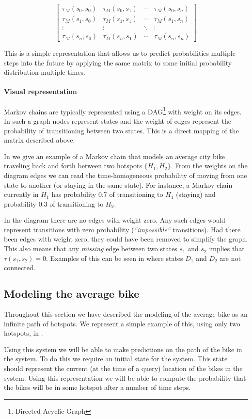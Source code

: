 \begin{equation}\label{markov:matrix}
\begin{bmatrix}
\tau_M(s_0, s_0) & \tau_M(s_0, s_1) & \cdots & \tau_M(s_0, s_n)\\
\tau_M(s_1, s_0) & \tau_M(s_1, s_1) & \cdots & \tau_M(s_1, s_n)\\
\vdots & \vdots & \ddots & \vdots\\
\tau_M(s_n, s_0) & \tau_M(s_n, s_1) & \cdots & \tau_M(s_n, s_n)
\end{bmatrix}
\end{equation}

This is a simple representation that allows us to predict probabilities multiple steps into the future by applying the same matrix to some initial probability distribution multiple times.

\paragraph{Visual representation}
Markov chains are typically represented using a DAG\footnote{Directed Acyclic Graph} with weight on its edges.
In such a graph nodes represent states and the weight of edges represent the probability of transitioning between two states.
This is a direct mapping of the matrix described above.

In  we give an example of a Markov chain that models an average city bike traveling back and forth between two hotspots $\{H_1, H_2\}$.
From the weights on the diagram edges we can read the time-homogeneous probability of moving from one state to another (or staying in the same state).
For instance, a Markov chain currently in $H_1$ has probability $0.7$ of transitioning to $H_1$ (staying) and probability $0.3$ of transitioning to $H_2$.

In the diagram there are no edges with weight zero.
Any such edges would represent transitions with zero probability (\textit{``impossible``} transitions).
Had there been edges with weight zero, they could have been removed to simplify the graph.
This also means that any \textit{missing} edge between two states $s_1$ and $s_2$ implies that $\tau(s_1, s_2) = 0$.
Examples of this can be seen in  where states $D_1$ and $D_2$ are not connected.

\subsection{Modeling the average bike}\label{markov:modeling}
Throughout this section we have described the modeling of the average bike as an infinite path of hotspots.
We represent a simple example of this, using only two hotspots, in .

Using this system we will be able to make predictions on the path of the bike in the system.
To do this we require an initial state for the system.
This state should represent the current (at the time of a query) location of the bikes in the system.
Using this representation we will be able to compute the probability that the bikes will be in some hotspot after a number of time steps.

